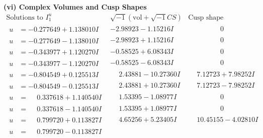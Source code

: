 \documentclass[1p]{elsarticle_modified}
\theoremstyle{definition}
\newcommand{\I}{\sqrt{-1}}
\begin{document}
\newpage\flushleft \textbf{(vi) Complex Volumes and Cusp Shapes}
$$\begin{array}{c|c|c}  
\text{Solutions to }I^u_{1}& \I (\text{vol} + \sqrt{-1}CS) & \text{Cusp shape}\\
 \hline 
\begin{aligned}
u &= -0.277649 + 1.138010 I\end{aligned}
 & -2.98923 - 1.15216 I & \phantom{-0.000000 } 0 \\ \hline\begin{aligned}
u &= -0.277649 - 1.138010 I\end{aligned}
 & -2.98923 + 1.15216 I & \phantom{-0.000000 } 0 \\ \hline\begin{aligned}
u &= -0.343977 + 1.120270 I\end{aligned}
 & -0.58525 + 6.08343 I & \phantom{-0.000000 } 0 \\ \hline\begin{aligned}
u &= -0.343977 - 1.120270 I\end{aligned}
 & -0.58525 - 6.08343 I & \phantom{-0.000000 } 0 \\ \hline\begin{aligned}
u &= -0.804549 + 0.125513 I\end{aligned}
 & \phantom{-}2.43881 - 10.27360 I & \phantom{-}7.12723 + 7.98252 I \\ \hline\begin{aligned}
u &= -0.804549 - 0.125513 I\end{aligned}
 & \phantom{-}2.43881 + 10.27360 I & \phantom{-}7.12723 - 7.98252 I \\ \hline\begin{aligned}
u &= \phantom{-}0.337618 + 1.140540 I\end{aligned}
 & \phantom{-}1.53395 - 1.08977 I & \phantom{-0.000000 } 0 \\ \hline\begin{aligned}
u &= \phantom{-}0.337618 - 1.140540 I\end{aligned}
 & \phantom{-}1.53395 + 1.08977 I & \phantom{-0.000000 } 0 \\ \hline\begin{aligned}
u &= \phantom{-}0.799720 + 0.113827 I\end{aligned}
 & \phantom{-}4.65256 + 5.23405 I & \phantom{-}10.45155 - 4.02810 I \\ \hline\begin{aligned}
u &= \phantom{-}0.799720 - 0.113827 I\end{aligned}

\end{array}$$
\end{document}
